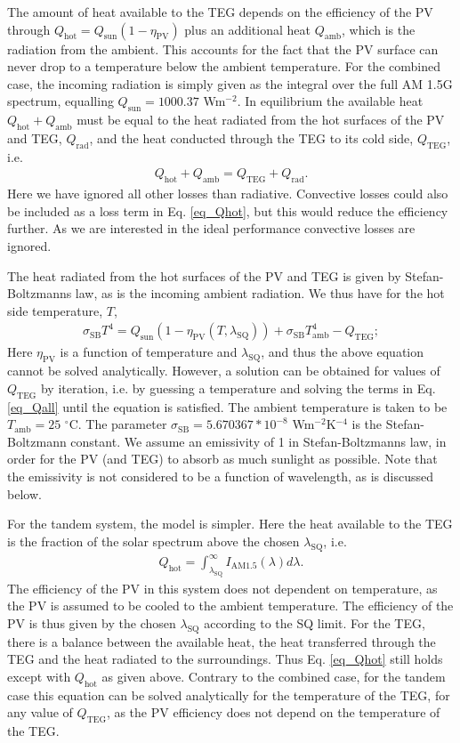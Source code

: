 \documentclass[fleqn,10pt]{SelfArx} %
\newcommand{\n}[1]{\mathrm{#1}}
\begin{document}
The amount of heat available to the TEG depends on the efficiency of the PV through $Q_\n{hot} = Q_\n{sun}(1-\eta_\n{PV})$ plus an additional heat $Q_\n{amb}$, which is the radiation from the ambient. This accounts for the fact that the PV surface can never drop to a temperature below the ambient temperature. For the combined case, the incoming radiation is simply given as the integral over the full AM 1.5G spectrum, equalling $Q_\n{sun}=1000.37$ Wm$^{-2}$. In equilibrium the available heat $Q_\n{hot}+Q_\n{amb}$ must be equal to the heat radiated from the hot surfaces of the PV and TEG, $Q_\n{rad}$, and the heat conducted through the TEG to its cold side, $Q_\n{TEG}$, i.e.
\begin{eqnarray}\label{eq_Qhot}
Q_\n{hot} + Q_\n{amb}= Q_\n{TEG} + Q_\n{rad}.
\end{eqnarray}
Here we have ignored all other losses than radiative. Convective losses could also be included as a loss term in Eq. \ref{eq_Qhot}, but this would reduce the efficiency further. As we are interested in the ideal performance convective losses are ignored.

The heat radiated from the hot surfaces of the PV and TEG is given by Stefan-Boltzmanns law, as is the incoming ambient radiation. We thus have for the hot side temperature, $T$,
\begin{eqnarray}\label{eq_Qall}
\sigma_\n{SB}T^4 = Q_\n{sun}\left(1-\eta_\n{PV}(T,\lambda_\n{SQ})\right) + \sigma_\n{SB}T_\n{amb}^4 - Q_\n{TEG};
\end{eqnarray}
Here $\eta_\n{PV}$ is a function of temperature and $\lambda_\n{SQ}$, and thus the above equation cannot be solved analytically. However, a solution can be obtained for values of $Q_\n{TEG}$ by iteration, i.e. by guessing a temperature and solving the terms in Eq. \ref{eq_Qall} until the equation is satisfied. The ambient temperature is taken to be $T_\n{amb}=25$ $^\circ$C. The parameter $\sigma_\n{SB}= 5.670367*10^{-8}$ Wm$^{-2}$K$^{-4}$ is the Stefan-Boltzmann constant.
We assume an emissivity of 1 in Stefan-Boltzmanns law, in order for the PV (and TEG) to absorb as much sunlight as possible. Note that the emissivity is not considered to be a function of wavelength, as is discussed below.

For the tandem system, the model is simpler. Here the heat available to the TEG is the fraction of the solar spectrum above the chosen $\lambda_\n{SQ}$, i.e.
\begin{eqnarray}
Q_\n{hot} = \int_{\lambda_\n{SQ}}^{\infty}I_\n{AM1.5}(\lambda)d\lambda.
\end{eqnarray}
The efficiency of the PV in this system does not dependent on temperature, as the PV is assumed to be cooled to the ambient temperature. The efficiency of the PV is thus given by the chosen $\lambda_\n{SQ}$ according to the SQ limit. For the TEG, there is a balance between the available heat, the heat transferred through the TEG and the heat radiated to the surroundings. Thus Eq. \ref{eq_Qhot} still holds except with $Q_\n{hot}$ as given above. Contrary to the combined case, for the tandem case this equation can be solved analytically for the temperature of the TEG, for any value of $Q_\n{TEG}$, as the PV efficiency does not depend on the temperature of the TEG.
\end{document}
